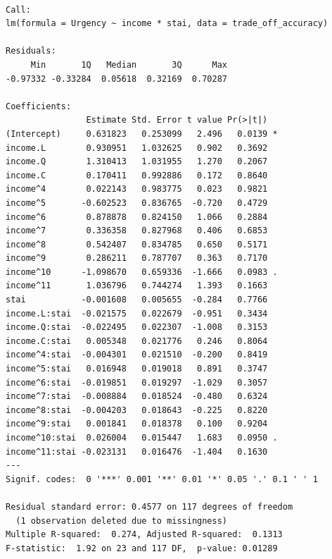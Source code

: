 \begin{verbatim}

Call:
lm(formula = Urgency ~ income * stai, data = trade_off_accuracy)

Residuals:
     Min       1Q   Median       3Q      Max 
-0.97332 -0.33284  0.05618  0.32169  0.70287 

Coefficients:
                Estimate Std. Error t value Pr(>|t|)  
(Intercept)     0.631823   0.253099   2.496   0.0139 *
income.L        0.930951   1.032625   0.902   0.3692  
income.Q        1.310413   1.031955   1.270   0.2067  
income.C        0.170411   0.992886   0.172   0.8640  
income^4        0.022143   0.983775   0.023   0.9821  
income^5       -0.602523   0.836765  -0.720   0.4729  
income^6        0.878878   0.824150   1.066   0.2884  
income^7        0.336358   0.827968   0.406   0.6853  
income^8        0.542407   0.834785   0.650   0.5171  
income^9        0.286211   0.787707   0.363   0.7170  
income^10      -1.098670   0.659336  -1.666   0.0983 .
income^11       1.036796   0.744274   1.393   0.1663  
stai           -0.001608   0.005655  -0.284   0.7766  
income.L:stai  -0.021575   0.022679  -0.951   0.3434  
income.Q:stai  -0.022495   0.022307  -1.008   0.3153  
income.C:stai   0.005348   0.021776   0.246   0.8064  
income^4:stai  -0.004301   0.021510  -0.200   0.8419  
income^5:stai   0.016948   0.019018   0.891   0.3747  
income^6:stai  -0.019851   0.019297  -1.029   0.3057  
income^7:stai  -0.008884   0.018524  -0.480   0.6324  
income^8:stai  -0.004203   0.018643  -0.225   0.8220  
income^9:stai   0.001841   0.018378   0.100   0.9204  
income^10:stai  0.026004   0.015447   1.683   0.0950 .
income^11:stai -0.023131   0.016476  -1.404   0.1630  
---
Signif. codes:  0 '***' 0.001 '**' 0.01 '*' 0.05 '.' 0.1 ' ' 1

Residual standard error: 0.4577 on 117 degrees of freedom
  (1 observation deleted due to missingness)
Multiple R-squared:  0.274, Adjusted R-squared:  0.1313 
F-statistic:  1.92 on 23 and 117 DF,  p-value: 0.01289
\end{verbatim}


